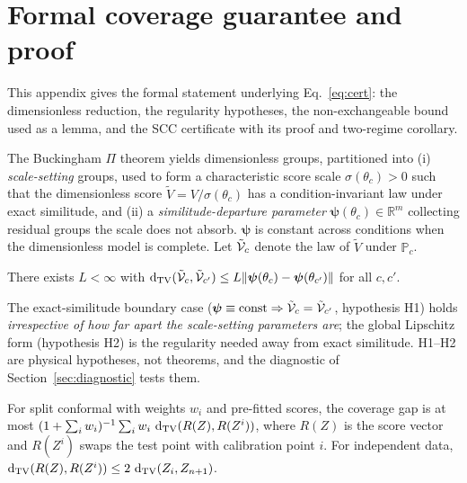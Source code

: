 \section{Formal coverage guarantee and proof}\label{app:proof}
This appendix gives the formal statement underlying Eq.~\eqref{eq:cert}: the dimensionless reduction,
the regularity hypotheses, the non-exchangeable bound used as a lemma, and the SCC certificate with
its proof and two-regime corollary.

\begin{definition}\label{def:pi}
The Buckingham $\Pi$ theorem yields dimensionless groups, partitioned into (i) \emph{scale-setting}
groups, used to form a characteristic score scale $\sigma(\theta_c)>0$ such that the dimensionless
score $\tilde V=V/\sigma(\theta_c)$ has a condition-invariant law under exact similitude, and (ii) a
\emph{similitude-departure parameter} $\boldsymbol\psi(\theta_c)\in\mathbb R^m$ collecting residual
groups the scale does not absorb. $\boldsymbol\psi$ is constant across conditions when the
dimensionless model is complete. Let $\tilde{\mathcal{V}}_{c}$ denote the law of $\tilde V$ under $\mathbb P_c$.
\end{definition}

\begin{assumption}\label{ass:lip}
There exists $L<\infty$ with
$\operatorname{d_{\mathrm{TV}}}(\tilde{\mathcal{V}}_{c},\tilde{\mathcal{V}}_{c'})\le L\lVert\boldsymbol\psi(\theta_c)-\boldsymbol\psi(\theta_{c'})\rVert$ for
all $c,c'$.
\end{assumption}
The exact-similitude boundary case
($\boldsymbol\psi\equiv\mathrm{const}\Rightarrow\tilde{\mathcal{V}}_{c}=\tilde{\mathcal{V}}_{c'}$, hypothesis H1) holds
\emph{irrespective of how far apart the scale-setting parameters are}; the global Lipschitz form
(hypothesis H2) is the regularity needed away from exact similitude. H1--H2 are physical hypotheses,
not theorems, and the diagnostic of Section~\ref{sec:diagnostic} tests them.

\begin{lemma}\label{lem:barber}
For split conformal with weights $w_i$ and pre-fitted scores, the coverage gap is at most
$(1+\sum_i w_i)^{-1}\sum_i w_i\,\operatorname{d_{\mathrm{TV}}}(R(Z),R(Z^i))$, where $R(Z)$ is the score vector and $R(Z^i)$
swaps the test point with calibration point $i$. For independent data,
$\operatorname{d_{\mathrm{TV}}}(R(Z),R(Z^i))\le 2\,\operatorname{d_{\mathrm{TV}}}(Z_i,Z_{n+1})$.
\end{lemma}

